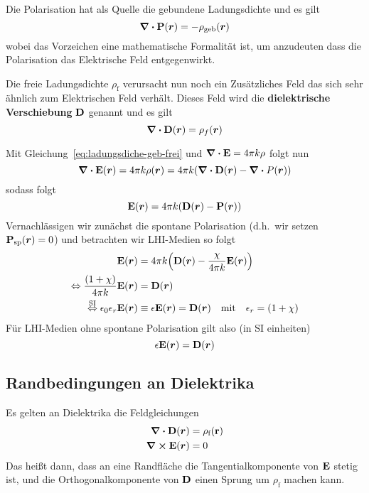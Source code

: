 Die Polarisation hat als Quelle die gebundene Ladungsdichte und es gilt
\begin{equation}
  \div \vb P(\vb*r) = -\rho_\text{geb}(\vb*r)
\end{equation}
wobei das Vorzeichen eine mathematische Formalität ist, um anzudeuten dass
die Polarisation das Elektrische Feld entgegenwirkt.

Die freie Ladungsdichte $\rho_\text{f}$ verursacht nun noch ein Zusätzliches
Feld das sich sehr ähnlich zum Elektrischen Feld verhält. Dieses Feld
wird die \textbf{dielektrische Verschiebung} $\vb D$ genannt und es gilt
\begin{equation}
  \div \vb D(\vb*r) = \rho_f(\vb*r)
\end{equation}

Mit Gleichung~\ref{eq:ladungsdiche-geb-frei} und $\div\vb E=4\pi k \rho$
folgt nun
\begin{equation*}
  \div \vb E(\vb*r) = 4\pi k \rho(\vb*r)=4\pi k(\div\vb D(\vb*r)-\div P(\vb*r))
\end{equation*}
sodass folgt
\begin{equation}
  \vb E(\vb*r) = 4\pi k (\vb D(\vb*r) - \vb P(\vb*r))
\end{equation}
Vernachlässigen wir zunächst die spontane Polarisation (d.h.\ wir setzen  
$\vb P_\text{sp}(\vb*r)=0$) und betrachten wir LHI-Medien so folgt
\begin{equation}
  \begin{split}
    \vb E(\vb*r) 
    &= 4\pi k \qty(\vb D(\vb*r) - \frac{\chi}{4\pi k} \vb E(\vb*r))\\
    \Leftrightarrow \frac{(1+\chi)}{4\pi k} \vb E(\vb*r) 
    &= \vb D(\vb*r)\\
    \stackrel{\text{SI}}{\Leftrightarrow} 
    \vb \epsilon_0\epsilon_r \vb E(\vb*r) 
    &\equiv 
    \epsilon \vb E(\vb*r)
    = \vb D(\vb*r) \quad \text{mit}\quad \epsilon_r = (1+\chi) \\
  \end{split}
\end{equation}
Für LHI-Medien ohne spontane Polarisation gilt also (in SI einheiten)
\begin{equation*}
  \epsilon \vb E(\vb*r) = \vb D(\vb*r) 
\end{equation*}

\subsection{Randbedingungen an Dielektrika}%
\label{sub:randbedingungen-an-dielektrika}
Es gelten an Dielektrika die Feldgleichungen
\begin{equation}
  \begin{split}
    \div \vb D(\vb*r) &= \rho_\text{f}(\vb r)\\
    \curl \vb E(\vb*r) &= 0\\
  \end{split}
\end{equation}
Das heißt dann, dass an eine Randfläche die 
Tangentialkomponente von $\vb E$ stetig ist, und
die Orthogonalkomponente von $\vb D$ einen Sprung um $\rho_\text{f}$ 
machen kann.
